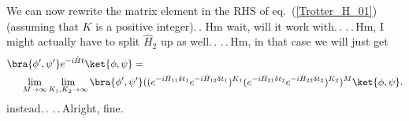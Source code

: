 \documentclass{report}
\begin{document}
We can now rewrite the matrix element in the RHS of eq.\ (\ref{Trotter_H_01}) (assuming that $K$ is a positive integer).\,. Hm wait, will it work with.\,. .\,.\,Hm, I might actually have to split $\hat H_2$ up as well.\,. .\,.\,Hm, in that case we will just get
\begin{align}
\begin{aligned}
	\bra{\phi', \psi'} e^{-i \hat H t} \ket{\phi, \psi} 
	=&\\%
	\lim_{M \to \infty} \lim_{K_1,K_2 \to \infty} 
		\bra{\phi', \psi'} &(
			(e^{-i  \hat H_{11} \delta t_1 } e^{-i \hat H_{12} \delta t_1})^{K_1}
			(e^{-i  \hat H_{21} \delta t_2 } e^{-i \hat H_{22} \delta t_2})^{K_2}
		)^M
		\ket{\phi, \psi}.
	\label{Trotter_H_02}
\end{aligned}
\end{align} 
instead.\,. .\,.\,Alright, fine. 
\end{document}
